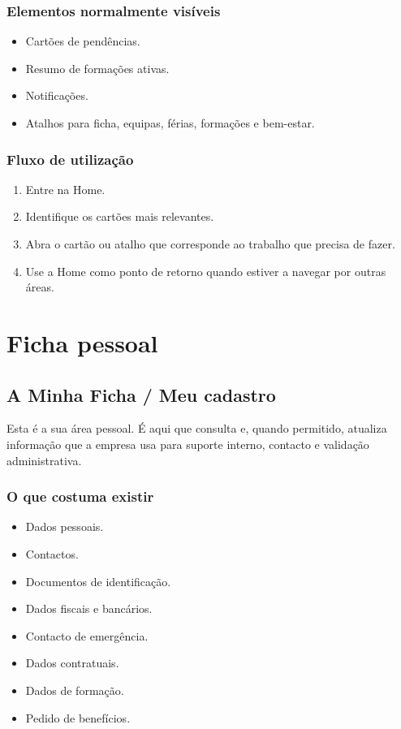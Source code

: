 \subsection{Elementos normalmente visíveis}
\begin{itemize}
  \item Cartões de pendências.
  \item Resumo de formações ativas.
  \item Notificações.
  \item Atalhos para ficha, equipas, férias, formações e bem-estar.
\end{itemize}

\subsection{Fluxo de utilização}
\begin{enumerate}
  \item Entre na Home.
  \item Identifique os cartões mais relevantes.
  \item Abra o cartão ou atalho que corresponde ao trabalho que precisa de fazer.
  \item Use a Home como ponto de retorno quando estiver a navegar por outras áreas.
\end{enumerate}

\chapter{Ficha pessoal}
\section{A Minha Ficha / Meu cadastro}
Esta é a sua área pessoal. É aqui que consulta e, quando permitido, atualiza informação que a empresa usa para suporte interno, contacto e validação administrativa.

\subsection{O que costuma existir}
\begin{itemize}
  \item Dados pessoais.
  \item Contactos.
  \item Documentos de identificação.
  \item Dados fiscais e bancários.
  \item Contacto de emergência.
  \item Dados contratuais.
  \item Dados de formação.
  \item Pedido de benefícios.
\end{itemize}

